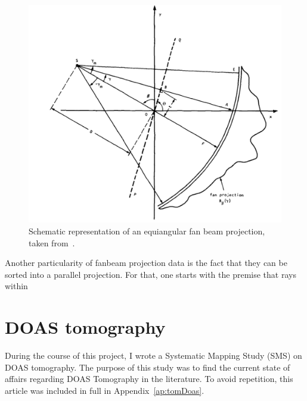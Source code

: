 \begin{figure}[htpb]
    \centering
    \includegraphics[width=.8\textwidth]{img/fig319.png}
    \caption{Schematic representation of an equiangular fan beam
    projection, taken from~\cite{Kak2001}.}
    \label{fig:equiangular}
\end{figure}

Another particularity of fanbeam projection data is the fact that they
can be sorted into a parallel projection. For that, one starts with the
premise that rays within


\section{DOAS tomography}%
\label{sec:doas_tomography}

During the course of this project, I wrote a Systematic Mapping Study
(\gls{SMS}) on DOAS tomography. The purpose of this study was to find
the current state of affairs regarding DOAS Tomography in the
literature. To avoid repetition, this article was included in full in
Appendix~\ref{ap:tomDoas}.


